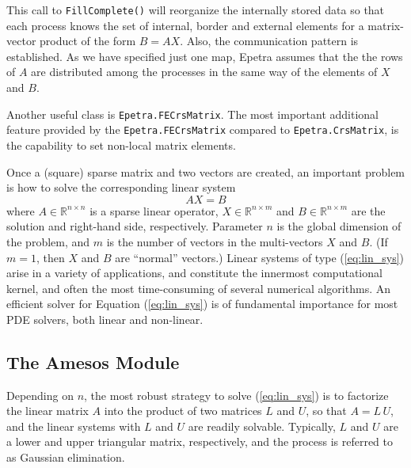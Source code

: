 \documentclass[10pt,relax]{SANDreport}
\begin{document}
This call to {\tt FillComplete()} will reorganize the internally
stored data so that each process knows the set of internal, border and
external elements for a matrix-vector product of the form $B =
AX$. Also, the communication pattern is established. As we have
specified just one map, Epetra assumes that the the rows of $A$ are
distributed among the processes in the same way of the elements of $X$
and $B$.

Another useful class is {\tt Epetra.FECrsMatrix}.  The most important
additional feature provided by the {\tt Epetra.FECrsMatrix} compared
to {\tt Epetra.CrsMatrix}, is the capability to set non-local matrix
elements.

\smallskip

Once a (square) sparse matrix and two vectors are created, an
important problem is how to solve the corresponding linear system
\begin{equation}
  \label{eq:lin_sys}
  A X = B
\end{equation}
where $A \in \mathbb{R}^{n \times n}$ is a sparse linear operator, $X
\in \mathbb{R}^{n \times m}$ and $B \in \mathbb{R}^{n \times m}$ are
the solution and right-hand side, respectively. Parameter $n$ is the
global dimension of the problem, and $m$ is the number of vectors in
the multi-vectors $X$ and $B$.  (If $m = 1$, then $X$ and $B$ are
``normal'' vectors.)  Linear systems of type (\ref{eq:lin_sys}) arise
in a variety of applications, and constitute the innermost
computational kernel, and often the most time-consuming of several
numerical algorithms. An efficient solver for Equation
(\ref{eq:lin_sys}) is of fundamental importance for most PDE solvers,
both linear and non-linear.

\subsection{The Amesos Module}
\label{subsec:amesos}

Depending on $n$, the most robust strategy to solve (\ref{eq:lin_sys})
is to factorize the linear matrix $A$ into the product of two matrices
$L$ and $U$, so that $A = L \, U$, and the linear systems with $L$ and
$U$ are readily solvable. Typically, $L$ and $U$ are a lower and upper
triangular matrix, respectively, and the process is referred to as
Gaussian elimination.
\end{document}
